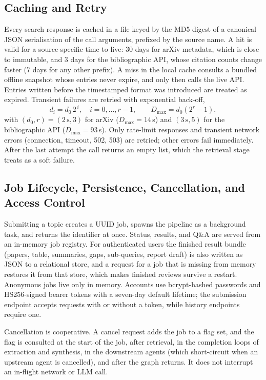\documentclass[conference]{IEEEtran}
\begin{document}
\subsection{Caching and Retry}
Every search response is cached in a file keyed by the MD5 digest of a canonical JSON serialisation of the call arguments, prefixed by the source name. A hit is valid for a source-specific time to live: 30 days for arXiv metadata, which is close to immutable, and 3 days for the bibliographic API, whose citation counts change faster (7 days for any other prefix). A miss in the local cache consults a bundled offline snapshot whose entries never expire, and only then calls the live API. Entries written before the timestamped format was introduced are treated as expired. Transient failures are retried with exponential back-off,
\begin{equation}
d_i=d_0\,2^{\,i},\quad i=0,\dots,r-1,\qquad D_{\max}=d_0(2^{r}-1),
\label{eq:backoff}
\end{equation}
with $(d_0,r)=(2\,\mathrm{s},3)$ for arXiv ($D_{\max}=14$\,s) and $(3\,\mathrm{s},5)$ for the bibliographic API ($D_{\max}=93$\,s). Only rate-limit responses and transient network errors (connection, timeout, 502, 503) are retried; other errors fail immediately. After the last attempt the call returns an empty list, which the retrieval stage treats as a soft failure.

\subsection{Job Lifecycle, Persistence, Cancellation, and Access Control}
Submitting a topic creates a UUID job, spawns the pipeline as a background task, and returns the identifier at once. Status, results, and Q\&A are served from an in-memory job registry. For authenticated users the finished result bundle (papers, table, summaries, gaps, sub-queries, report draft) is also written as JSON to a relational store, and a request for a job that is missing from memory restores it from that store, which makes finished reviews survive a restart. Anonymous jobs live only in memory. Accounts use bcrypt-hashed passwords and HS256-signed bearer tokens with a seven-day default lifetime; the submission endpoint accepts requests with or without a token, while history endpoints require one.

Cancellation is cooperative. A cancel request adds the job to a flag set, and the flag is consulted at the start of the job, after retrieval, in the completion loops of extraction and synthesis, in the downstream agents (which short-circuit when an upstream agent is cancelled), and after the graph returns. It does not interrupt an in-flight network or LLM call.
\end{document}
